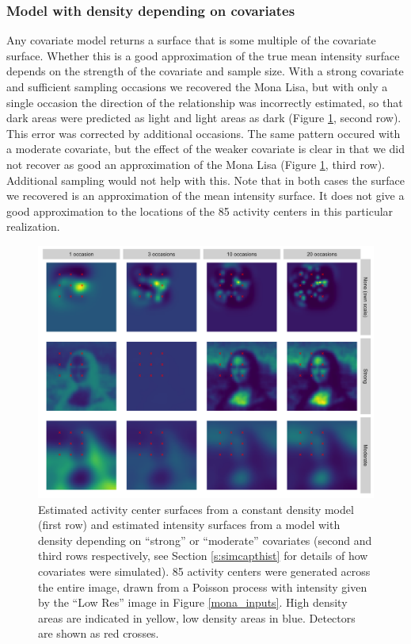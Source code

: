 \documentclass[a4paper,12pt]{article}
\begin{document}
\subsubsection{Model with density depending on covariates}

Any covariate model returns a surface that is some multiple of the covariate surface. Whether this is a good approximation of the true mean intensity surface depends on the strength of the covariate and sample size. With a strong covariate and sufficient sampling occasions we recovered the Mona Lisa, but with only a single occasion the direction of the relationship was incorrectly estimated, so that dark areas were predicted as light and light areas as dark (Figure \ref{peaky}, second row). This error was corrected by additional occasions. The same pattern occured with a moderate covariate, but the effect of the weaker covariate is clear in that we did not recover as good an approximation of the Mona Lisa (Figure \ref{peaky}, third row). Additional sampling would not help with this. Note that in both cases the surface we recovered is an approximation of the mean intensity surface. It does not give a good approximation to the locations of the 85 activity centers in this particular realization.

\begin{figure}[htbp]
\centering
\includegraphics[width=1\textwidth]{mona_peaky.png}
\caption{Estimated activity center surfaces from a constant density model (first row) and estimated intensity surfaces from a model with density depending on ``strong'' or ``moderate'' covariates (second and third rows respectively, see Section \ref{s:simcapthist} for details of how covariates were simulated). 85 activity centers were generated across the entire image, drawn from a Poisson process with intensity given by the ``Low Res'' image in Figure \ref{mona_inputs}. High density areas are indicated in yellow, low density areas in blue. Detectors are shown as red crosses.}
\label{peaky}
\end{figure}
\end{document}
